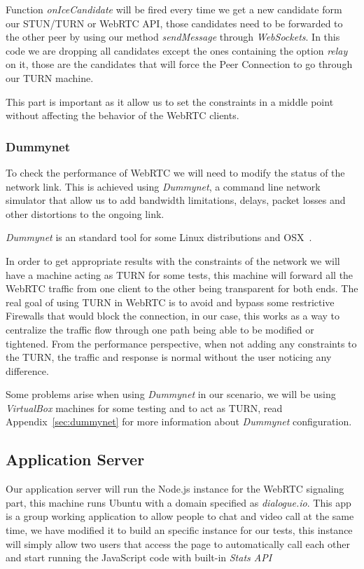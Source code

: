 Function {\it onIceCandidate} will be fired every time we get a new candidate form our STUN/TURN or WebRTC API, those candidates need to be forwarded to the other peer by using our method {\it sendMessage} through {\it WebSockets}. In this code we are dropping all candidates except the ones containing the option {\it relay} on it, those are the candidates that will force the Peer Connection to go through our TURN machine.

This part is important as it allow us to set the constraints in a middle point without affecting the behavior of the WebRTC clients.

\subsubsection{Dummynet}

To check the performance of WebRTC we will need to modify the status of the network link. This is achieved using {\it Dummynet}, a command line network simulator that allow us to add bandwidth limitations, delays, packet losses and other distortions to the ongoing link.

{\it Dummynet} is an standard tool for some Linux distributions and OSX~\cite{dummynetTool}.

In order to get appropriate results with the constraints of the network we will have a machine acting as TURN for some tests, this machine will forward all the WebRTC traffic from one client to the other being transparent for both ends. The real goal of using TURN in WebRTC is to avoid and bypass some restrictive Firewalls that would block the connection, in our case, this works as a way to centralize the traffic flow through one path being able to be modified or tightened. From the performance perspective, when not adding any constraints to the TURN, the traffic and response is normal without the user noticing any difference.

Some problems arise when using {\it Dummynet} in our scenario, we will be using {\it VirtualBox} machines for some testing and to act as TURN, read Appendix~\ref{sec:dummynet} for more information about {\it Dummynet} configuration.

\subsection{Application Server}

Our application server will run the Node.js instance for the WebRTC signaling part, this machine runs Ubuntu with a domain specified as {\it dialogue.io}. This app is a group working application to allow people to chat and video call at the same time, we have modified it to build an specific instance for our tests, this instance will simply allow two users that access the page to automatically call each other and start running the JavaScript code with built-in {\it Stats API}

